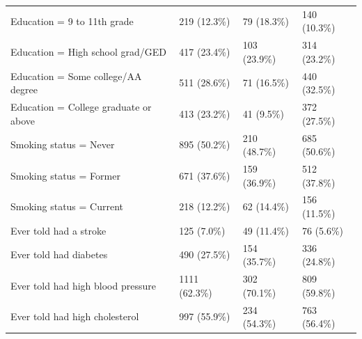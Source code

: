 \documentclass[12pt]{article}
\begin{document}
\begin{longtable}{L{4.6cm}R{3.35cm}R{3.35cm}R{3.35cm}}
Education = 9 to 11th grade & 219 (12.3\%) & 79 (18.3\%) & 140 (10.3\%) \\
Education = High school grad/GED & 417 (23.4\%) & 103 (23.9\%) & 314 (23.2\%) \\
Education = Some college/AA degree & 511 (28.6\%) & 71 (16.5\%) & 440 (32.5\%) \\
Education = College graduate or above & 413 (23.2\%) & 41 (9.5\%) & 372 (27.5\%) \\
Smoking status = Never & 895 (50.2\%) & 210 (48.7\%) & 685 (50.6\%) \\
Smoking status = Former & 671 (37.6\%) & 159 (36.9\%) & 512 (37.8\%) \\
Smoking status = Current & 218 (12.2\%) & 62 (14.4\%) & 156 (11.5\%) \\
Ever told had a stroke & 125 (7.0\%) & 49 (11.4\%) & 76 (5.6\%) \\
Ever told had diabetes & 490 (27.5\%) & 154 (35.7\%) & 336 (24.8\%) \\
Ever told had high blood pressure & 1111 (62.3\%) & 302 (70.1\%) & 809 (59.8\%) \\
Ever told had high cholesterol & 997 (55.9\%) & 234 (54.3\%) & 763 (56.4\%) \\
\end{longtable}
\end{document}
